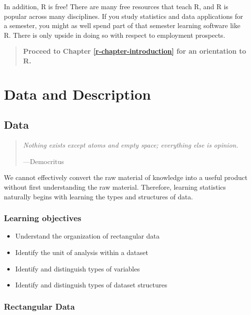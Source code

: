 \documentclass[
]{book}
\providecommand{\tightlist}{%
  \setlength{\itemsep}{0pt}\setlength{\parskip}{0pt}}
\begin{document}
In addition, R is free! There are many free resources that teach R, and R is popular across many disciplines. If you study statistics and data applications for a semester, you might as well spend part of that semester learning software like R. There is only upside in doing so with respect to employment prospects.

\begin{quote}
\textbf{Proceed to Chapter \ref{r-chapter-introduction} for an orientation to R.}
\end{quote}

\hypertarget{part-data-and-description}{%
\part{Data and Description}\label{part-data-and-description}}

\hypertarget{data}{%
\chapter{Data}\label{data}}

\begin{quote}
\emph{Nothing exists except atoms and empty space; everything else is opinion.}

---Democritus
\end{quote}

We cannot effectively convert the raw material of knowledge into a useful product without first understanding the raw material. Therefore, learning statistics naturally begins with learning the types and structures of data.

\hypertarget{lo2}{%
\section{Learning objectives}\label{lo2}}

\begin{itemize}
\tightlist
\item
  Understand the organization of rectangular data
\item
  Identify the unit of analysis within a dataset
\item
  Identify and distinguish types of variables
\item
  Identify and distinguish types of dataset structures
\end{itemize}

\hypertarget{rectangular-data}{%
\section{Rectangular Data}\label{rectangular-data}}
\end{document}
